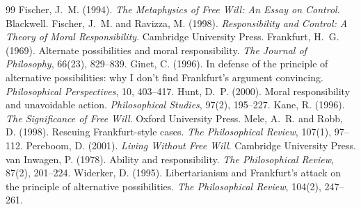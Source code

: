 \documentclass{situationist-preprint}
\begin{document}
\begin{thebibliography}{99}\small
{} Fischer, J.~M. (1994). \emph{The Metaphysics of Free Will: An Essay on Control}. Blackwell.
 Fischer, J.~M. and Ravizza, M. (1998). \emph{Responsibility and Control: A Theory of Moral Responsibility}. Cambridge University Press.
 Frankfurt, H.~G. (1969). Alternate possibilities and moral responsibility. \emph{The Journal of Philosophy}, 66(23), 829--839.
 Ginet, C. (1996). In defense of the principle of alternative possibilities: why I don't find Frankfurt's argument convincing. \emph{Philosophical Perspectives}, 10, 403--417.
 Hunt, D.~P. (2000). Moral responsibility and unavoidable action. \emph{Philosophical Studies}, 97(2), 195--227.
 Kane, R. (1996). \emph{The Significance of Free Will}. Oxford University Press.
 Mele, A.~R. and Robb, D. (1998). Rescuing Frankfurt-style cases. \emph{The Philosophical Review}, 107(1), 97--112.
 Pereboom, D. (2001). \emph{Living Without Free Will}. Cambridge University Press.
 van Inwagen, P. (1978). Ability and responsibility. \emph{The Philosophical Review}, 87(2), 201--224.
 Widerker, D. (1995). Libertarianism and Frankfurt's attack on the principle of alternative possibilities. \emph{The Philosophical Review}, 104(2), 247--261.
\end{thebibliography}
\end{document}
